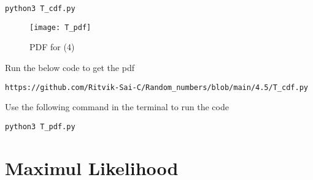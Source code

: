 \documentclass[journal,12pt,twocolumn]{IEEEtran}
\renewcommand\thesection{\arabic{section}}
\theoremstyle{remark}
\numberwithin{equation}{section}
\begin{document}
\begin{enumerate}[label=\thesection.\arabic*
,ref=\thesection.\theenumi]
\begin{lstlisting}
python3 T_cdf.py
\end{lstlisting}
\begin{figure}[h]
\texttt{[image: T\_pdf]}
\caption{PDF for (4)}
\label{fig:T_PDF}
\end{figure}
Run the below code to get the pdf
\begin{lstlisting}
https://github.com/Ritvik-Sai-C/Random_numbers/blob/main/4.5/T_cdf.py
\end{lstlisting}
Use the following command in the terminal to run the code
\begin{lstlisting}
python3 T_pdf.py
\end{lstlisting}
\end{enumerate}
\section{Maximul Likelihood}
\end{document}
